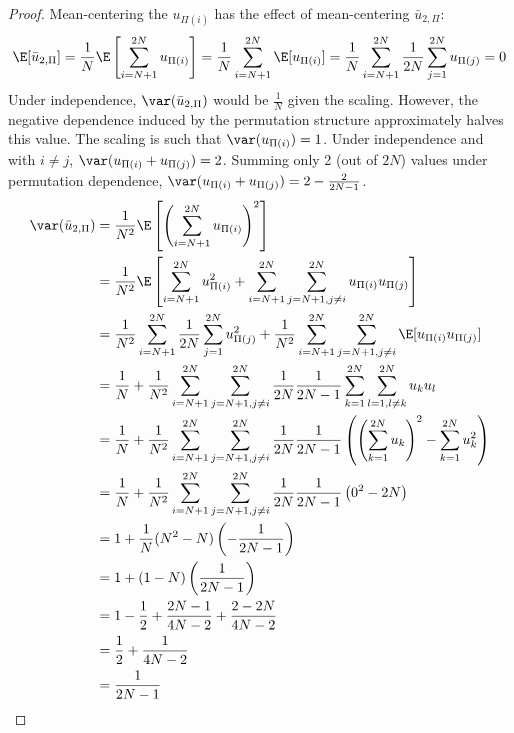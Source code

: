 \begin{proof}
  Mean-centering the $u_{\Pi(i)}$ has the effect of mean-centering $\bar{u}_{2,\Pi}$:
  \begin{equation*}
    \E[\bar{u}_{2,\Pi}] = 
    \frac{1}{N} \E \left [ \sum_{i=N+1}^{2N} u_{\Pi(i)} \right ] = 
    \frac{1}{N} \sum_{i=N+1}^{2N} \E[u_{\Pi(i)}] = 
    \frac{1}{N} \sum_{i=N+1}^{2N} \frac{1}{2N} \sum_{j=1}^{2N} u_{\Pi(j)} = 0
  \end{equation*}
  Under independence, $\var(\bar{u}_{2,\Pi})$ would be $\frac{1}{N}$ given
  the scaling.  However, the negative dependence induced by the
  permutation structure approximately halves this value.
  The scaling is such that $\var(u_{\Pi(i)}) = 1$.  Under independence and
  with $i \neq j$, $\var(u_{\Pi(i)} + u_{\Pi(j)}) = 2$.  Summing only 2 (out of $2N$)
  values under permutation dependence, $\var(u_{\Pi(i)} + u_{\Pi(j)}) = 2 - \frac{2}{2N-1}$.
  \begin{align*}
    \var(\bar{u}_{2,\Pi}) 
    &= \frac{1}{N^2} \E \left [\left (\sum_{i=N+1}^{2N}u_{\Pi(i)}\right
      )^2\right ] \\
    &= \frac{1}{N^2} \E \left [\sum_{i=N+1}^{2N} u_{\Pi(i)}^2 +
    \sum_{i=N+1}^{2N}\sum_{j=N+1, j\neq i}^{2N}u_{\Pi(i)}u_{\Pi(j)} \right ] \\
    &= \frac{1}{N^2} \sum_{i=N+1}^{2N} \frac{1}{2N} \sum_{j=1}^{2N} u_{\Pi(j)}^2
    + \frac{1}{N^2}\sum_{i=N+1}^{2N}\sum_{j=N+1, j\neq
      i}^{2N} \E[u_{\Pi(i)} u_{\Pi(j)}] \\
    &= \frac{1}{N} + \frac{1}{N^2}\sum_{i=N+1}^{2N}\sum_{j=N+1, j\neq
      i}^{2N} \frac{1}{2N}\frac{1}{2N-1}\sum_{k=1}^{2N}
    \sum_{l=1, l\neq k}^{2N} u_ku_l \\
    &= \frac{1}{N} + \frac{1}{N^2}\sum_{i=N+1}^{2N}\sum_{j=N+1, j\neq
      i}^{2N} \frac{1}{2N}\frac{1}{2N-1} \left (
    \left (\sum_{k=1}^{2N} u_k \right )^2 - \sum_{k=1}^{2N} u_k^2
  \right ) \\
    &= \frac{1}{N} + \frac{1}{N^2}\sum_{i=N+1}^{2N}\sum_{j=N+1, j\neq
      i}^{2N} \frac{1}{2N}\frac{1}{2N-1} \left (
    0^2 - 2N \right ) \\
    &= 1 + \frac{1}{N}(N^2-N)\left (-\frac{1}{2N-1}\right ) \\
    &= 1 + (1-N)\left (\frac{1}{2N-1}\right ) \\
    &= 1 - \frac{1}{2} + \frac{2N-1}{4N-2} + \frac{2-2N}{4N-2} \\
    &= \frac{1}{2} + \frac{1}{4N-2} \\
    &= \frac{1}{2N-1}
  \end{align*}


\end{proof}
